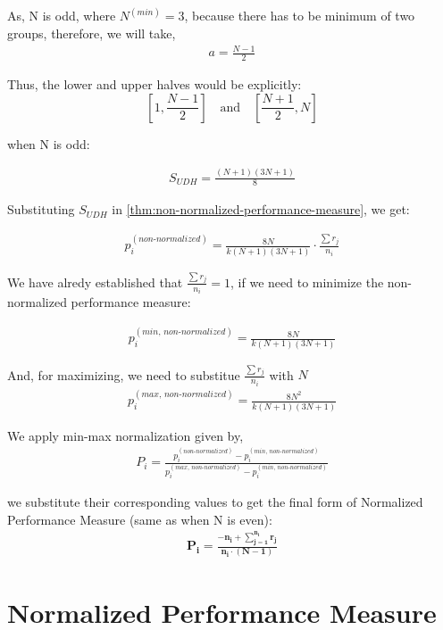 \documentclass[a4paper,fleqn,review]{cas-sc}
\begin{document}
As, N is odd, where $N^{(min)} = 3$, because there has to be minimum of two groups, therefore, we will take,
\begin{align*}
	a = \frac{N-1}{2}
\end{align*}

Thus, the lower and upper halves would be explicitly:
\[
\left[1, \frac{N-1}{2}\right] \quad \text{and} \quad \left[\frac{N+1}{2}, N\right]
\]

when N is odd:

\begin{align*}
	S_{UDH} = \frac{(N+1)(3N+1)}{8}
\end{align*}

Substituting  $S_{UDH}$ in \autoref{thm:non-normalized-performance-measure}, 
we get:

\begin{align*}
	p_i^{(non\text{-}normalized)} = \frac{8N}{k(N+1)(3N+1)} \cdot \frac{\sum r_j}{n_i}
\end{align*}

We have alredy established that $\frac{\sum r_j}{n_i} = 1$,
if we need to minimize the non-normalized performance measure:

\begin{align*}
	p_i^{(min, \, non\text{-}normalized)} = \frac{8N}{k (N+1)(3N+1)}
\end{align*}

And, for maximizing, we need to substitue
$
	\frac{\sum r_j}{n_i}
$ with $N$
\begin{align*}
	p_i^{(max, \, non\text{-}normalized)} = \frac{8N^2}{k (N+1)(3N+1)}
\end{align*}


We apply min-max normalization given by,
\begin{align*}
	P_i = \frac{p_i^{(non\text{-}normalized)} - p_i^{(min, \, non\text{-}normalized)}}{p_i^{(max, \, non\text{-}normalized)} - p_i^{(min, \, non\text{-}normalized)}}
\end{align*}

we substitute their corresponding values to get the final form of Normalized Performance Measure (same as when N is even):
\begin{align*}
	\boxed{
		\mathbf{
			P_i = \frac{-n_i +  \sum\limits_{j=1}^{n_i} r_j}{n_i \cdot (N - 1)}}
	}
\end{align*}

\section{Normalized Performance Measure}
\end{document}
